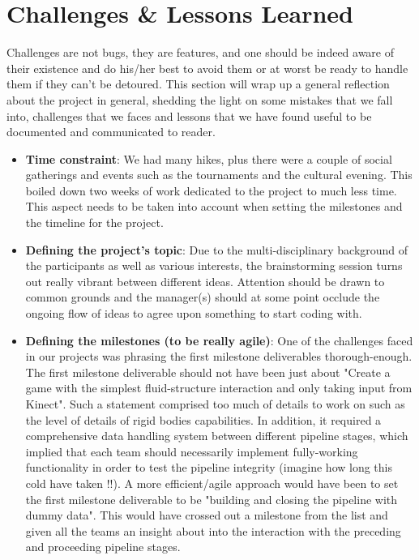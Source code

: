 \section{Challenges \& Lessons Learned}
Challenges are not bugs, they are features, and one should be indeed aware of their existence and do his/her best to avoid them or at worst be ready to handle them if they can't be detoured. This section will wrap up a general reflection about the project in general, shedding the light on some mistakes that we fall into, challenges that we faces and lessons that we have found useful to be documented and communicated to reader.

\begin{itemize}
  \item \textbf{Time constraint}: We had many hikes, plus there were a couple of social gatherings and events such as the tournaments and the cultural evening. This boiled down two weeks of work dedicated to the project to much less time. This aspect needs to be taken into account when setting the milestones and the timeline for the project.
  \item \textbf{Defining the project's topic}: Due to the multi-disciplinary background of the participants as well as various interests, the brainstorming session turns out really vibrant between different ideas. Attention should be drawn to common grounds and the manager(s) should at some point occlude the ongoing flow of ideas to agree upon something to start coding with.
  \item \textbf{Defining the milestones (to be really agile)}: One of the challenges faced in our projects was phrasing the first milestone deliverables thorough-enough. The first milestone deliverable should not have been just about "Create a game with the simplest fluid-structure interaction and only taking input from Kinect". Such a statement comprised too much of details to work on such as the level of details of rigid bodies capabilities. In addition, it required a comprehensive data handling system between different pipeline stages, which implied that each team should necessarily implement fully-working functionality in order to test the pipeline integrity (imagine how long this cold have taken !!).
  A more efficient/agile approach would have been to set the first milestone deliverable to be "building and closing the pipeline with dummy data". This would have crossed out a milestone from the list and given all the teams an insight about into the interaction with the preceding and proceeding pipeline stages.

\end{itemize}
